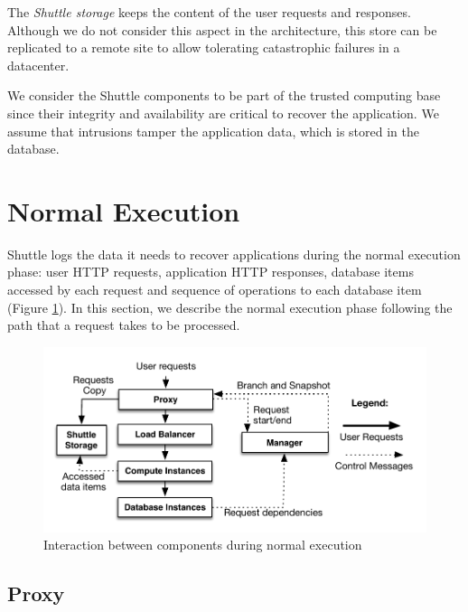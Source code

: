 The \emph{Shuttle storage} keeps the content of the user requests and responses. Although we do not consider this aspect in the architecture, this store can be replicated to a remote site to allow tolerating catastrophic failures in a datacenter.

We consider the Shuttle components to be part of the trusted computing base since their integrity and availability are critical to recover the application. We assume that intrusions tamper the application data, which is stored in the database.





\section{Normal Execution}
\label{sec:architecture:normal_execution}

Shuttle logs the data it needs to recover applications during the normal execution phase: user HTTP requests, application HTTP responses, database items accessed by each request and sequence of operations to each database item (Figure \ref{fig:normal_execution}). In this section, we describe the normal execution phase following the path that a request takes to be processed.

\begin{figure}
  \centering
  \includegraphics[width=0.9\linewidth]{images/normalExecution}
  \caption{Interaction between components during normal execution}
  \label{fig:normal_execution}
\end{figure}

\subsection{Proxy}
\label{sec:architecture:proxy}

